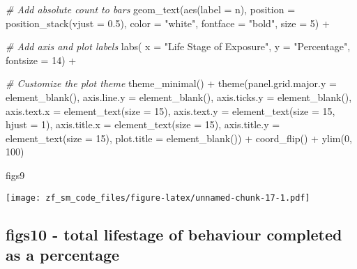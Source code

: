\documentclass[
]{article}
\newenvironment{Shaded}{\begin{snugshade}}{\end{snugshade}}
\newcommand{\AttributeTok}[1]{\textcolor[rgb]{0.77,0.63,0.00}{#1}}
\newcommand{\CommentTok}[1]{\textcolor[rgb]{0.56,0.35,0.01}{\textit{#1}}}
\newcommand{\DecValTok}[1]{\textcolor[rgb]{0.00,0.00,0.81}{#1}}
\newcommand{\FloatTok}[1]{\textcolor[rgb]{0.00,0.00,0.81}{#1}}
\newcommand{\FunctionTok}[1]{\textcolor[rgb]{0.00,0.00,0.00}{#1}}
\newcommand{\NormalTok}[1]{#1}
\newcommand{\SpecialCharTok}[1]{\textcolor[rgb]{0.00,0.00,0.00}{#1}}
\newcommand{\StringTok}[1]{\textcolor[rgb]{0.31,0.60,0.02}{#1}}
\begin{document}
\begin{Shaded}
\begin{Highlighting}[]
   \CommentTok{\# Add absolute count to bars}
  \FunctionTok{geom\_text}\NormalTok{(}\FunctionTok{aes}\NormalTok{(}\AttributeTok{label =}\NormalTok{ n), }\AttributeTok{position =} \FunctionTok{position\_stack}\NormalTok{(}\AttributeTok{vjust =} \FloatTok{0.5}\NormalTok{), }\AttributeTok{color =} \StringTok{"white"}\NormalTok{, }\AttributeTok{fontface =} \StringTok{"bold"}\NormalTok{, }\AttributeTok{size =} \DecValTok{5}\NormalTok{) }\SpecialCharTok{+}
  
  \CommentTok{\# Add axis and plot labels }
  \FunctionTok{labs}\NormalTok{( }\AttributeTok{x =} \StringTok{"Life Stage of Exposure"}\NormalTok{, }\AttributeTok{y =} \StringTok{"Percentage"}\NormalTok{, }\AttributeTok{fontsize =} \DecValTok{14}\NormalTok{) }\SpecialCharTok{+}
  
  \CommentTok{\# Customize the plot theme }
  \FunctionTok{theme\_minimal}\NormalTok{() }\SpecialCharTok{+}
  \FunctionTok{theme}\NormalTok{(}\AttributeTok{panel.grid.major.y =} \FunctionTok{element\_blank}\NormalTok{(),}
    \AttributeTok{axis.line.y =} \FunctionTok{element\_blank}\NormalTok{(),}
    \AttributeTok{axis.ticks.y =} \FunctionTok{element\_blank}\NormalTok{(),}
    \AttributeTok{axis.text.x =} \FunctionTok{element\_text}\NormalTok{(}\AttributeTok{size =} \DecValTok{15}\NormalTok{),}
    \AttributeTok{axis.text.y =} \FunctionTok{element\_text}\NormalTok{(}\AttributeTok{size =} \DecValTok{15}\NormalTok{, }\AttributeTok{hjust =} \DecValTok{1}\NormalTok{),}
    \AttributeTok{axis.title.x =} \FunctionTok{element\_text}\NormalTok{(}\AttributeTok{size =} \DecValTok{15}\NormalTok{),}
    \AttributeTok{axis.title.y =} \FunctionTok{element\_text}\NormalTok{(}\AttributeTok{size =} \DecValTok{15}\NormalTok{),}
    \AttributeTok{plot.title =} \FunctionTok{element\_blank}\NormalTok{()) }\SpecialCharTok{+}
  \FunctionTok{coord\_flip}\NormalTok{() }\SpecialCharTok{+} 
  \FunctionTok{ylim}\NormalTok{(}\DecValTok{0}\NormalTok{, }\DecValTok{100}\NormalTok{)}

\NormalTok{figs9}
\end{Highlighting}
\end{Shaded}

\texttt{[image: zf\_sm\_code\_files/figure-latex/unnamed-chunk-17-1.pdf]}

\hypertarget{figs10---total-lifestage-of-behaviour-completed-as-a-percentage}{%
\subsection{figs10 - total lifestage of behaviour completed as a
percentage}\label{figs10---total-lifestage-of-behaviour-completed-as-a-percentage}}
\end{document}
